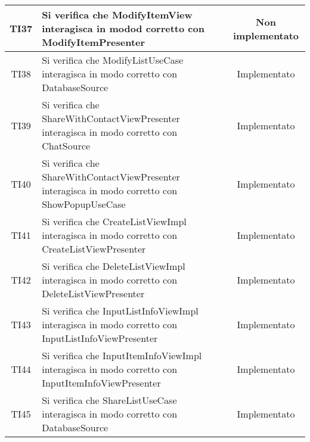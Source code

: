 \begin{center}
\begin{longtable}{|c|>{\centering}m{10cm}|c|}
		TI37 & Si verifica che ModifyItemView interagisca in modod corretto con ModifyItemPresenter & Non implementato \\ \hline
		TI38 & Si verifica che ModifyListUseCase interagisca in modo corretto con DatabaseSource & Implementato \\ \hline
		TI39 & Si verifica che ShareWithContactViewPresenter interagisca in modo corretto con ChatSource & Implementato \\ \hline
		TI40 & Si verifica che ShareWithContactViewPresenter interagisca in modo corretto con ShowPopupUseCase & Implementato \\ \hline
		TI41 & Si verifica che CreateListViewImpl interagisca in modo corretto con CreateListViewPresenter & Implementato \\ \hline
		TI42 & Si verifica che DeleteListViewImpl interagisca in modo corretto con DeleteListViewPresenter & Implementato \\ \hline
		TI43 & Si verifica che InputListInfoViewImpl interagisca in modo corretto con InputListInfoViewPresenter & Implementato \\ \hline
		TI44 & Si verifica che InputItemInfoViewImpl interagisca in modo corretto con InputItemInfoViewPresenter & Implementato \\ \hline
		TI45 & Si verifica che ShareListUseCase interagisca in modo corretto con DatabaseSource & Implementato \\ \hline
	\end{longtable}
\end{center}
